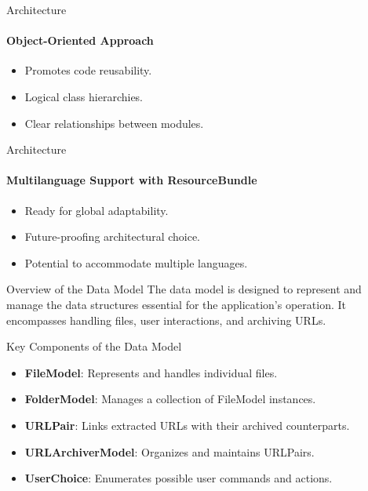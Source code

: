 \documentclass[
    ngerman,%
    authorontitle=true,
]{bfhbeamer}
\begin{document}
    \begin{frame}{Architecture}
        \framesubtitle{Object-Oriented Approach}
        \begin{itemize}
            \item Promotes code reusability.
            \item Logical class hierarchies.
            \item Clear relationships between modules.
        \end{itemize}
    \end{frame}

    \begin{frame}{Architecture}
        \framesubtitle{Multilanguage Support with ResourceBundle}
        \begin{itemize}
            \item Ready for global adaptability.
            \item Future-proofing architectural choice.
            \item Potential to accommodate multiple languages.
        \end{itemize}
    \end{frame}

    \begin{frame}{Overview of the Data Model}
        The data model is designed to represent and manage the data structures essential for the application's operation. It encompasses handling files, user interactions, and archiving URLs.
    \end{frame}

    \begin{frame}{Key Components of the Data Model}
        \begin{itemize}
            \item \textbf{FileModel}: Represents and handles individual files.
            \item \textbf{FolderModel}: Manages a collection of FileModel instances.
            \item \textbf{URLPair}: Links extracted URLs with their archived counterparts.
            \item \textbf{URLArchiverModel}: Organizes and maintains URLPairs.
            \item \textbf{UserChoice}: Enumerates possible user commands and actions.
        \end{itemize}
    \end{frame}
\end{document}
